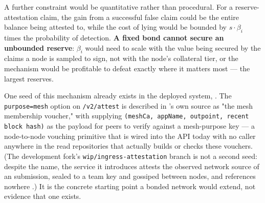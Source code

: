 A further constraint would be quantitative rather than procedural. For a reserve-attestation claim,
the gain from a successful false claim could be the entire balance being attested to, while the
cost of lying would be bounded by $s \cdot \beta_i$ times the probability of detection.
\textbf{A fixed bond cannot secure an unbounded reserve}: $\beta_i$ would need to scale with the
value being secured by the claims a node is sampled to sign, not with the node's \FluxNode
collateral tier, or the mechanism would be profitable to defeat exactly where it matters most — the
largest reserves.
 

One seed of this mechanism already exists in the deployed system, \inprogress. The
\texttt{purpose=\allowbreak{}mesh} option on \texttt{/v2/attest} is described in \fluxsas's own source as "the
mesh membership voucher," with \FluxOS supplying \texttt{(mesh\allowbreak{}Ca, app\allowbreak{}Name, outpoint, recent block
hash)} as the payload for peers to verify against a mesh-purpose key
 — a node-to-node vouching primitive that is wired
into the API today with no caller anywhere in the read repositories that actually builds or checks
these vouchers. (The \FluxOS development fork's \texttt{wip/\allowbreak{}ingress-attestation} branch is
not a second seed: despite the name, the service it introduces attests the observed network source
of an \appspec submission, sealed to a team key and gossiped between nodes, and references \fluxsas
nowhere
.)
It is the
concrete starting point a bonded network would extend, not evidence that one exists.

